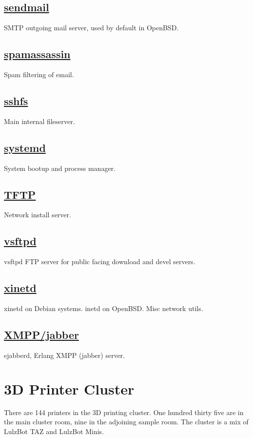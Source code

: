 \subsection{\href{http://www.openbsd.org/cgi-bin/man.cgi/OpenBSD-current/man8/sendmail.8?query=sendmail&sec=8}{sendmail}}
SMTP outgoing mail server, used by default in OpenBSD.

\subsection{\href{http://www.spamassassin.org/}{spamassassin}}
Spam filtering of email.

\subsection{\href{http://fuse.sourceforge.net/sshfs.html}{sshfs}}
Main internal fileserver.

\subsection{\href{http://www.freedesktop.org/wiki/Software/systemd}{systemd}}
System bootup and process manager.

\subsection{\href{http://dnsmasq.org/}{TFTP}}
Network install server.

\subsection{\href{http://vsftpd.beasts.org/}{vsftpd}}
vsftpd FTP server for public facing download and devel servers.

\subsection{\href{http://www.xinetd.org}{xinetd}}
xinetd on Debian systems. inetd on OpenBSD. Misc network utils.

\subsection{\href{http://www.ejabberd.im/}{XMPP/jabber}}
ejabberd, Erlang XMPP (jabber) server.


\section{3D Printer Cluster}
There are 144 printers in the 3D printing cluster. One hundred thirty five are
in the main cluster room, nine in the adjoining sample room. The cluster is a
mix of LulzBot TAZ and LulzBot Minis.

